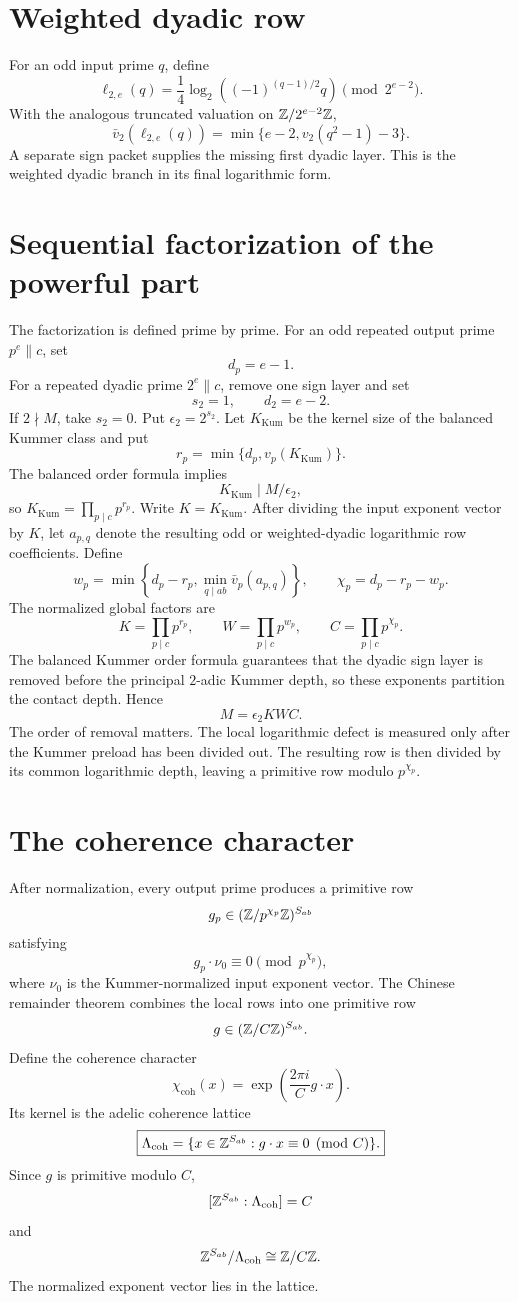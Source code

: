 \section{Weighted dyadic row}
For an odd input prime $q$, define
\[
 \ell_{2,e}(q)
 =
 \frac14
 \log_2\left((-1)^{(q-1)/2}q\right)
 \pmod{2^{e-2}}.
\]
With the analogous truncated valuation on $\mathbb Z/2^{e-2}\mathbb Z$,
\[
 \bar v_2(\ell_{2,e}(q))
 =
 \min\{e-2,v_2(q^2-1)-3\}.
\]
A separate sign packet supplies the missing first dyadic layer. This is the weighted dyadic branch in its final logarithmic form.

\section{Sequential factorization of the powerful part}
The factorization is defined prime by prime. For an odd repeated output prime $p^e\parallel c$, set
\[
 d_p=e-1.
\]
For a repeated dyadic prime $2^e\parallel c$, remove one sign layer and set
\[
 s_2=1,
 \qquad
 d_2=e-2.
\]
If $2\nmid M$, take $s_2=0$. Put $\epsilon_2=2^{s_2}$. Let $K_{\mathrm{Kum}}$ be the kernel size of the balanced Kummer class and put
\[
 r_p=\min\{d_p,v_p(K_{\mathrm{Kum}})\}.
\]
The balanced order formula implies
\[
 K_{\mathrm{Kum}}\mid M/\epsilon_2,
\]
so $K_{\mathrm{Kum}}=\prod_{p\mid c}p^{r_p}$. Write $K=K_{\mathrm{Kum}}$. After dividing the input exponent vector by $K$, let $a_{p,q}$ denote the resulting odd or weighted-dyadic logarithmic row coefficients. Define
\[
 w_p
 =
 \min\left
 \{
 d_p-r_p,
 \min_{q\mid ab}\bar v_p(a_{p,q})
 \right\},
 \qquad
 \chi_p=d_p-r_p-w_p.
\]
The normalized global factors are
\[
 K=\prod_{p\mid c}p^{r_p},
 \qquad
 W=\prod_{p\mid c}p^{w_p},
 \qquad
 C=\prod_{p\mid c}p^{\chi_p}.
\]
The balanced Kummer order formula guarantees that the dyadic sign layer is removed before the principal $2$-adic Kummer depth, so these exponents partition the contact depth. Hence
\[
 \boxed{
 M=\epsilon_2KWC.
 }
\]
The order of removal matters. The local logarithmic defect is measured only after the Kummer preload has been divided out. The resulting row is then divided by its common logarithmic depth, leaving a primitive row modulo $p^{\chi_p}$.

\section{The coherence character}
After normalization, every output prime produces a primitive row
\[
 g_p
 \in
 (\mathbb Z/p^{\chi_p}\mathbb Z)^{S_{ab}}
\]
satisfying
\[
 g_p\cdot\nu_0
 \equiv0
 \pmod{p^{\chi_p}},
\]
where $\nu_0$ is the Kummer-normalized input exponent vector. The Chinese remainder theorem combines the local rows into one primitive row
\[
 g\in(\mathbb Z/C\mathbb Z)^{S_{ab}}.
\]
Define the coherence character
\[
 \boxed{
 \chi_{\mathrm{coh}}(x)
 =
 \exp\left(\frac{2\pi i}{C}g\cdot x\right).
 }
\]
Its kernel is the adelic coherence lattice
\[
 \boxed{
 \Lambda_{\mathrm{coh}}
 =
 \{x\in\mathbb Z^{S_{ab}}:g\cdot x\equiv0\pmod C\}.
 }
\]
Since $g$ is primitive modulo $C$,
\[
 [\mathbb Z^{S_{ab}}:\Lambda_{\mathrm{coh}}]=C
\]
and
\[
 \mathbb Z^{S_{ab}}/\Lambda_{\mathrm{coh}}\cong\mathbb Z/C\mathbb Z.
\]
The normalized exponent vector lies in the lattice.

